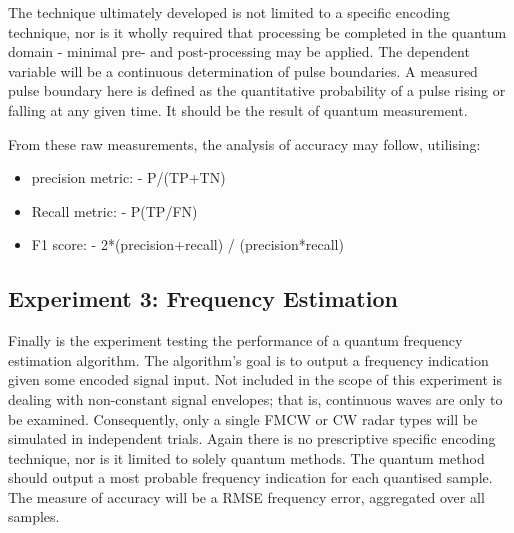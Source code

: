 The technique ultimately developed is not limited to a specific encoding technique, nor is it wholly required that processing be completed in the quantum domain - minimal pre- and post-processing may be applied.
The dependent variable will be a continuous determination of pulse boundaries.
A measured pulse boundary here is defined as the quantitative probability of a pulse rising or falling at any given time.
It should be the result of quantum measurement.

From these raw measurements, the analysis of accuracy may follow, utilising:
\begin{itemize}
    \item precision metric:
-  P/(TP+TN)
    \item Recall metric:
-  P(TP/FN)
    \item F1 score:
-  2*(precision+recall) / (precision*recall)
\end{itemize}


\subsection{Experiment 3: Frequency Estimation}

Finally is the experiment testing the performance of a quantum frequency estimation algorithm.
The algorithm's goal is to output a frequency indication given some encoded signal input.
Not included in the scope of this experiment is dealing with non-constant signal envelopes; that is, continuous waves are only to be examined.
Consequently, only a single \ac{FMCW} or \ac{CW} radar types will be simulated in independent trials.
Again there is no prescriptive specific encoding technique, nor is it limited to solely quantum
methods.
The quantum method should output a most probable frequency indication for each quantised sample.
The measure of accuracy will be a \ac{RMSE} frequency error, aggregated over all samples. 


